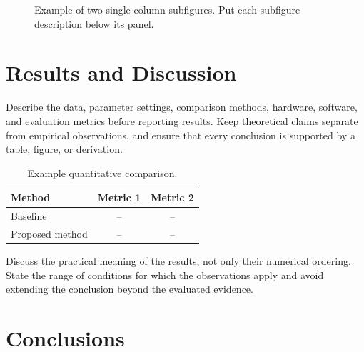 \documentclass[final,3p,times,twocolumn]{elsarticle}
\begin{document}
\begin{figure}[tbp]
  \centering
  \hfill
  \caption{Example of two single-column subfigures. Put each subfigure description below its panel.}
  \label{fig:example}
\end{figure}

\section{Results and Discussion}

Describe the data, parameter settings, comparison methods, hardware, software, and evaluation metrics before reporting results. Keep theoretical claims separate from empirical observations, and ensure that every conclusion is supported by a table, figure, or derivation.

\begin{table}[H]
  \centering
  \caption{Example quantitative comparison.}
  \label{tab:example}
  \begin{tabular}{lcc}
    \toprule
    Method & Metric 1 & Metric 2 \\
    \midrule
    Baseline & -- & -- \\
    Proposed method & -- & -- \\
    \bottomrule
  \end{tabular}
\end{table}

Discuss the practical meaning of the results, not only their numerical ordering. State the range of conditions for which the observations apply and avoid extending the conclusion beyond the evaluated evidence.

\section{Conclusions}
\end{document}
